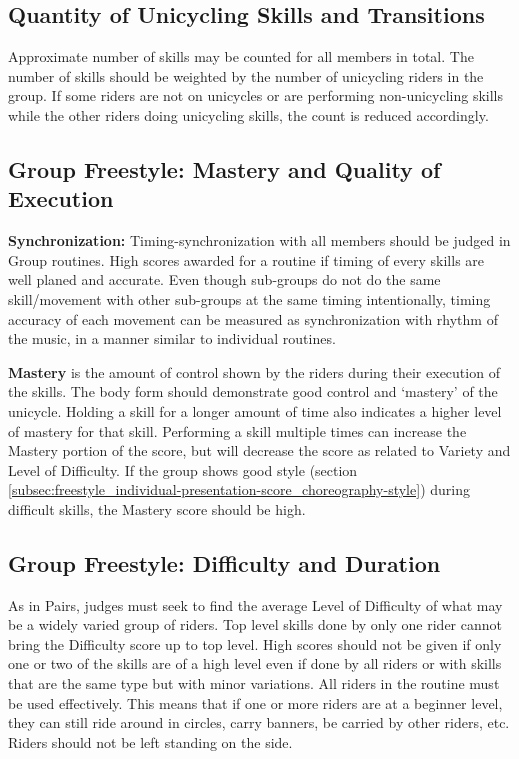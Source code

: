 \subsection{Quantity of Unicycling Skills and Transitions}
Approximate number of skills may be counted for all members in total.
The number of skills should be weighted by the number of unicycling riders in the group.
If some riders are not on unicycles or are performing non-unicycling skills while the other riders doing unicycling skills, the count is reduced accordingly.

\subsection{Group Freestyle: Mastery and Quality of Execution}
\textbf{Synchronization:} Timing-synchronization with all members should be judged in Group routines.
High scores awarded for a routine if timing of every skills are well planed and accurate.
Even though sub-groups do not do the same skill/movement with other sub-groups at the same timing intentionally, timing accuracy of each movement can be measured as synchronization with rhythm of the music, in a manner similar to individual routines.

\textbf{Mastery} is the amount of control shown by the riders during their execution of the skills.
The body form should demonstrate good control and `mastery' of the unicycle.
Holding a skill for a longer amount of time also indicates a higher level of mastery for that skill.
Performing a skill multiple times can increase the Mastery portion of the score, but will decrease the score as related to Variety and Level of Difficulty.
If the group shows good style (section \ref{subsec:freestyle_individual-presentation-score_choreography-style}) during difficult skills, the Mastery score should be high.

\subsection{Group Freestyle: Difficulty and Duration \label{subsec:freestyle_group-additional-judging-criteria_difficulty-duration}}
As in Pairs, judges must seek to find the average Level of Difficulty of what may be a widely varied group of riders.
Top level skills done by only one rider cannot bring the Difficulty score up to top level.
High scores should not be given if only one or two of the skills are of a high level even if done by all riders or with skills that are the same type but with minor variations.
All riders in the routine must be used effectively.
This means that if one or more riders are at a beginner level, they can still ride around in circles, carry banners, be carried by other riders, etc.
Riders should not be left standing on the side.

